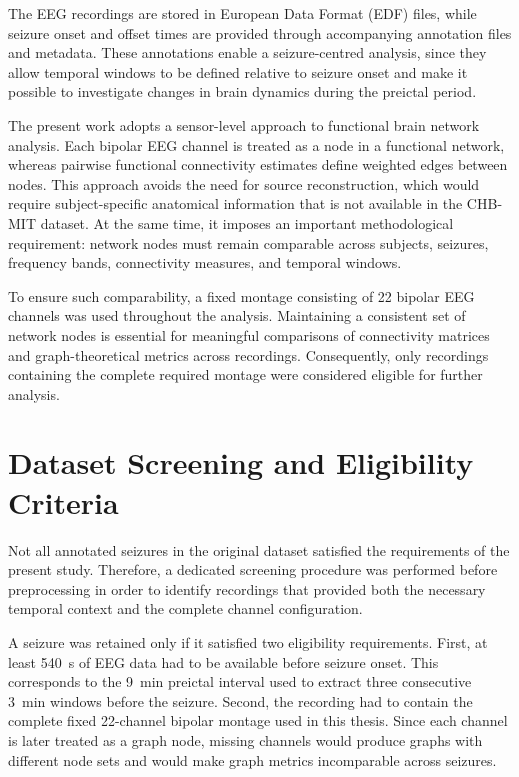 The EEG recordings are stored in European Data Format (EDF) files, while
seizure onset and offset times are provided through accompanying annotation
files and metadata. These annotations enable a seizure-centred analysis, since
they allow temporal windows to be defined relative to seizure onset and make it
possible to investigate changes in brain dynamics during the preictal period.

The present work adopts a sensor-level approach to functional brain network
analysis. Each bipolar EEG channel is treated as a node in a functional
network, whereas pairwise functional connectivity estimates define weighted
edges between nodes. This approach avoids the need for source reconstruction,
which would require subject-specific anatomical information that is not
available in the CHB-MIT dataset. At the same time, it imposes an important
methodological requirement: network nodes must remain comparable across
subjects, seizures, frequency bands, connectivity measures, and temporal
windows.

To ensure such comparability, a fixed montage consisting of \num{22} bipolar
EEG channels was used throughout the analysis. Maintaining a consistent set of
network nodes is essential for meaningful comparisons of connectivity matrices
and graph-theoretical metrics across recordings. Consequently, only recordings
containing the complete required montage were considered eligible for further
analysis.

\section{Dataset Screening and Eligibility Criteria}
\label{sec:dataset-screening-eligibility}

Not all annotated seizures in the original dataset satisfied the requirements
of the present study. Therefore, a dedicated screening procedure was performed
before preprocessing in order to identify recordings that provided both the
necessary temporal context and the complete channel configuration.

A seizure was retained only if it satisfied two eligibility requirements. First,
at least \SI{540}{\second} of EEG data had to be available before seizure onset.
This corresponds to the \SI{9}{\minute} preictal interval used to extract three
consecutive \SI{3}{\minute} windows before the seizure. Second, the recording
had to contain the complete fixed \num{22}-channel bipolar montage used in this
thesis. Since each channel is later treated as a graph node, missing channels
would produce graphs with different node sets and would make graph metrics
incomparable across seizures.

